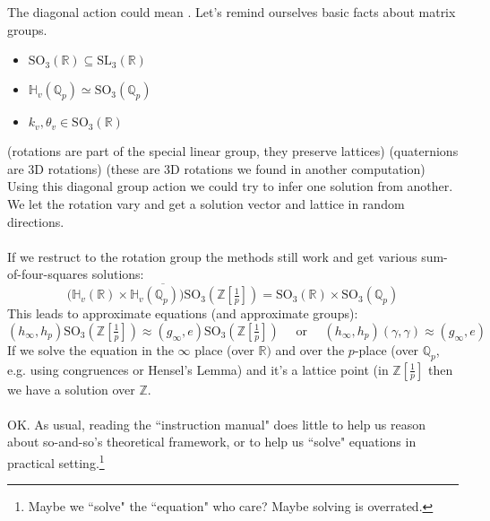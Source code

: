 \documentclass[12pt]{article}
\begin{document}
{The diagonal action could mean .  Let's remind ourselves basic facts about matrix groups.
\begin{itemize}
\item $\text{SO}_3(\mathbb{R}) \subseteq \text{SL}_3(\mathbb{R}) $ 
\item $\mathbb{H}_v(\mathbb{Q}_p) \simeq \text{SO}_3(\mathbb{Q}_p)$ 
\item $k_v, \theta_v \in \text{SO}_3(\mathbb{R})$ 
\end{itemize}
(rotations are part of the special linear group, they preserve lattices) (quaternions are 3D rotations) (these are 3D rotations we found  in another computation)  Using this diagonal group action we could try to infer one solution from another.  We let the rotation vary and get a solution vector and lattice in random directions. \\ \\
If we restruct to the rotation group the methods still work and get various sum-of-four-squares solutions:
$$\overline{ \big(\mathbb{H}_v(\mathbb{R}) \times \mathbb{H}_v(\mathbb{Q}_p)\big) \text{SO}_3(\mathbb{Z}[\tfrac{1}{p}]) }  = \text{SO}_3(\mathbb{R}) \times \text{SO}_3(\mathbb{Q}_p) $$
This leads to approximate equations (and approximate groups):
$$  (h_\infty, h_p) \text{SO}_3(\mathbb{Z}[\tfrac{1}{p}]) \approx (g_\infty, e)\text{SO}_3(\mathbb{Z}[\tfrac{1}{p}]) \quad\text{ or }\quad
(h_\infty, h_p) (\gamma, \gamma) \approx (g_\infty, e)$$
If we solve the equation in the $\infty$ place (over $\mathbb{R})$ and over the $p$-place 
(over $\mathbb{Q}_p$, e.g. using congruences or Hensel's Lemma) and it's a lattice point (in $\mathbb{Z}[\frac{1}{p}]$ then we have a solution over $\mathbb{Z}$. \\ \\
OK.  As usual, reading the ``instruction manual" does little to help us reason about so-and-so's theoretical framework, or to help us ``solve" equations in practical setting.\footnote{Maybe we ``solve" the ``equation" who care?  Maybe solving is overrated.}
}
\end{document}
